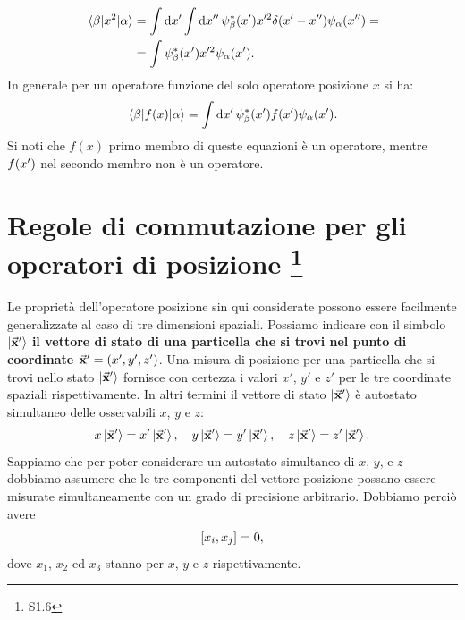 \documentclass[a4paper,12pt,oneside]{book}
\begin{document}
\begin{align}
  \mel{\beta}{x^2}{\alpha} &=\int\dd{x'}\int\dd{x''} \psi_{\beta}^*\qty(x')x'^2\delta\qty(x'-x'')\psi_{\alpha}\qty(x'') =\nonumber\\
  &= \int\psi_{\beta}^*\qty(x')x'^2\psi_{\alpha}\qty(x') .
\end{align}
In generale per un operatore funzione del solo operatore posizione $x$ si ha:
\begin{equation}
  \mel{\beta}{f(x)}{\alpha} = \int\dd{x'}\psi_{\beta}^*\qty(x')f\qty(x')\psi_{\alpha}\qty(x') .
\end{equation}
Si noti che $f(x)$ primo membro di queste equazioni è un operatore, mentre $f\qty(x')$ nel secondo membro non è un operatore.
\section[Regole di commutazione per gli operatori di posizione]{Regole di commutazione per gli operatori di posizione \footnote{S1.6}}
Le proprietà dell'operatore posizione sin qui considerate possono essere facilmente generalizzate al caso di tre dimensioni spaziali.
Possiamo indicare con il simbolo $\ket{\va{x}'}$ \textbf{il vettore di stato di una particella che si trovi nel punto di coordinate $\va{x}'= \qty(x',y',z')$}.
Una misura di posizione per una particella che si trovi nello stato $\ket{\va{x}'}$ fornisce con certezza i valori $x'$, $y'$ e $z'$ per le tre coordinate spaziali rispettivamente. In altri termini il vettore di stato $\ket{\va{x}'}$ è autostato simultaneo delle osservabili $x$, $y$ e $z$:
\begin{equation}
  x\ket{\va{x}'}=x'\ket{\va{x}'},\quad y\ket{\va{x}'}=y'\ket{\va{x}'},\quad z\ket{\va{x}'}=z'\ket{\va{x}'} .
\end{equation}
Sappiamo che per poter considerare un autostato simultaneo di $x$, $y$, e $z$ dobbiamo assumere che le tre componenti del vettore posizione possano essere misurate simultaneamente con un grado di precisione arbitrario. Dobbiamo perciò avere
\begin{equation}
  \comm{x_i}{x_j}= 0 ,
\end{equation}
dove $x_1$, $x_2$ ed $x_3$ stanno per $x$, $y$ e $z$ rispettivamente.
\end{document}

